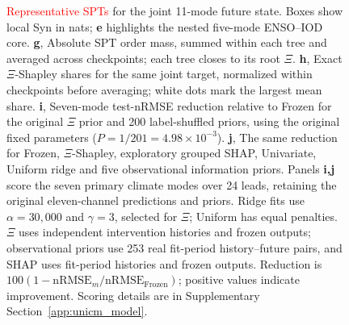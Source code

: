 \documentclass[fleqn,10pt]{wlscirep}
\newcommand{\rev}[1]{\textcolor{red}{#1}}
\theoremstyle{naturetheorem}
\begin{document}
\begin{figure}[p]
{{\rev{Representative SPTs} for the joint 11-mode future state. Boxes show local Syn in nats; \textbf{e} highlights the nested five-mode ENSO--IOD core. \textbf{g}, Absolute SPT order mass, summed within each tree and averaged across checkpoints; each tree closes to its root $\Xi$. \textbf{h}, Exact $\Xi$-Shapley shares for the same joint target, normalized within checkpoints before averaging; white dots mark the largest mean share. \textbf{i}, Seven-mode test-nRMSE reduction relative to Frozen for the original $\Xi$ prior and 200 label-shuffled priors, using the original fixed parameters ($P=1/201=4.98\times10^{-3}$). \textbf{j}, The same reduction for Frozen, $\Xi$-Shapley, exploratory grouped SHAP, Univariate, Uniform ridge and five observational information priors. Panels \textbf{i,j} score the seven primary climate modes over 24 leads, retaining the original eleven-channel predictions and priors. Ridge fits use $\alpha=30{,}000$ and $\gamma=3$, selected for $\Xi$; Uniform has equal penalties. $\Xi$ uses independent intervention histories and frozen outputs; observational priors use 253 real fit-period history--future pairs, and SHAP uses fit-period histories and frozen outputs. Reduction is $100(1-\mathrm{nRMSE}_{m}/\mathrm{nRMSE}_{\mathrm{Frozen}})$; positive values indicate improvement. Scoring details are in Supplementary Section~\ref{app:unicm_model}.}}
    \label{fig:unicm_hierarchical_ei}
\end{figure}
\end{document}
